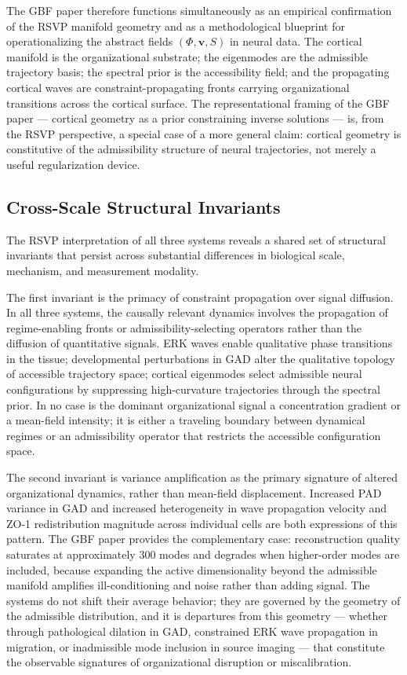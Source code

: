 \documentclass[11pt,a4paper]{article}
\theoremstyle{plain}
\theoremstyle{definition}
\begin{document}
The GBF paper therefore functions simultaneously as an empirical confirmation of the
RSVP manifold geometry and as a methodological blueprint for operationalizing the
abstract fields $(\Phi, \mathbf{v}, S)$ in neural data. The cortical manifold is the
organizational substrate; the eigenmodes are the admissible trajectory basis; the
spectral prior is the accessibility field; and the propagating cortical waves are
constraint-propagating fronts carrying organizational transitions across the cortical
surface. The representational framing of the GBF paper --- cortical geometry as a
prior constraining inverse solutions --- is, from the RSVP perspective, a special
case of a more general claim: cortical geometry is constitutive of the admissibility
structure of neural trajectories, not merely a useful regularization device.

\subsection{Cross-Scale Structural Invariants}

The RSVP interpretation of all three systems reveals a shared set of structural invariants
that persist across substantial differences in biological scale, mechanism, and measurement
modality.

The first invariant is the primacy of constraint propagation over signal diffusion.
In all three systems, the causally relevant dynamics involves the propagation of
regime-enabling fronts or admissibility-selecting operators rather than the diffusion
of quantitative signals. ERK waves enable qualitative phase transitions in the tissue;
developmental perturbations in GAD alter the qualitative topology of accessible
trajectory space; cortical eigenmodes select admissible neural configurations by
suppressing high-curvature trajectories through the spectral prior. In no case is the
dominant organizational signal a concentration gradient or a mean-field intensity;
it is either a traveling boundary between dynamical regimes or an admissibility
operator that restricts the accessible configuration space.

The second invariant is variance amplification as the primary signature of altered
organizational dynamics, rather than mean-field displacement. Increased PAD variance in
GAD and increased heterogeneity in wave propagation velocity and ZO-1 redistribution
magnitude across individual cells are both expressions of this pattern. The GBF paper
provides the complementary case: reconstruction quality saturates at approximately
300 modes and degrades when higher-order modes are included, because expanding the
active dimensionality beyond the admissible manifold amplifies ill-conditioning and
noise rather than adding signal. The systems do not shift their average behavior;
they are governed by the geometry of the admissible distribution, and it is departures
from this geometry — whether through pathological dilation in GAD, constrained
ERK wave propagation in migration, or inadmissible mode inclusion in source imaging ---
that constitute the observable signatures of organizational disruption or miscalibration.
\end{document}
